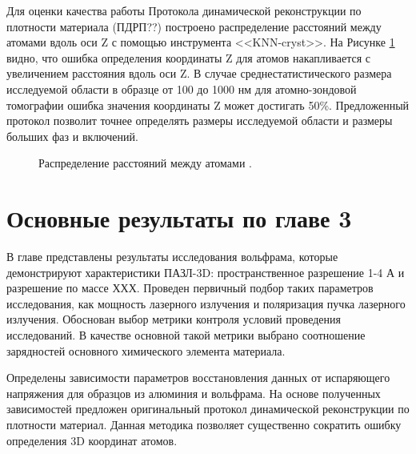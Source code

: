 Для оценки качества работы Протокола динамической реконструкции по плотности материала (ПДРП??) построено распределение расстояний между атомами вдоль оси Z с помощью инструмента <<KNN-cryst>>. На Рисунке \cref{fig:p3_atomiccount_distance} видно, что ошибка определения координаты Z для атомов накапливается с увеличением расстояния вдоль оси Z. В случае среднестатистического размера исследуемой области в 
образце от 100 до 1000 нм для атомно-зондовой томографии ошибка значения координаты Z может достигать 50\%. Предложенный протокол позволит точнее определять размеры исследуемой области и размеры больших фаз и включений.

\begin{figure}[htb]
	\caption{Распределение расстояний между атомами \cite{scbibDensity}.}
	\label{fig:p3_atomiccount_distance}
\end{figure}




\FloatBarrier
\clearpage
\section{Основные результаты по главе 3}\label{sec:ch3/sect6}

В главе представлены результаты исследования вольфрама, которые демонстрируют характеристики ПАЗЛ-3D: пространственное разрешение 1-4 А и разрешение по массе ХХХ. Проведен первичный подбор таких параметров исследования, как мощность лазерного излучения и поляризация пучка лазерного излучения. Обоснован выбор метрики контроля условий проведения исследований. В качестве основной такой метрики выбрано соотношение зарядностей основного химического элемента материала.

Определены зависимости параметров восстановления данных от испаряющего напряжения для образцов из алюминия и вольфрама. На основе полученных зависимостей предложен оригинальный протокол динамической реконструкции по плотности материал. Данная методика позволяет существенно сократить ошибку определения 3D координат атомов.










\clearpage
